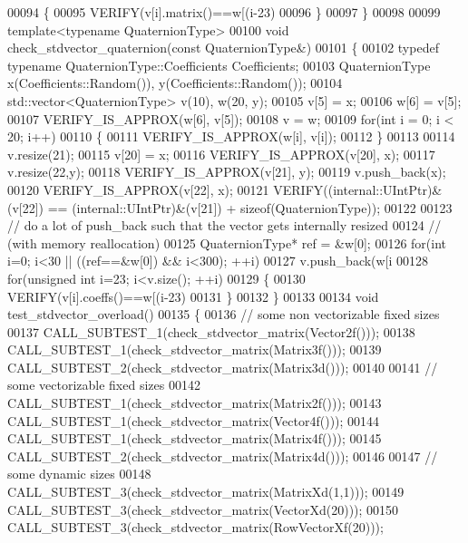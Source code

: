 \begin{DoxyCode}
00094   \{
00095     VERIFY(v[i].matrix()==w[(i-23)%
00096   \}
00097 \}
00098 
00099 \textcolor{keyword}{template}<\textcolor{keyword}{typename} QuaternionType>
00100 \textcolor{keywordtype}{void} check\_stdvector\_quaternion(\textcolor{keyword}{const} QuaternionType&)
00101 \{
00102   \textcolor{keyword}{typedef} \textcolor{keyword}{typename} QuaternionType::Coefficients Coefficients;
00103   QuaternionType x(Coefficients::Random()), y(Coefficients::Random());
00104   std::vector<QuaternionType> v(10), w(20, y);
00105   v[5] = x;
00106   w[6] = v[5];
00107   VERIFY\_IS\_APPROX(w[6], v[5]);
00108   v = w;
00109   \textcolor{keywordflow}{for}(\textcolor{keywordtype}{int} i = 0; i < 20; i++)
00110   \{
00111     VERIFY\_IS\_APPROX(w[i], v[i]);
00112   \}
00113 
00114   v.resize(21);
00115   v[20] = x;
00116   VERIFY\_IS\_APPROX(v[20], x);
00117   v.resize(22,y);
00118   VERIFY\_IS\_APPROX(v[21], y);
00119   v.push\_back(x);
00120   VERIFY\_IS\_APPROX(v[22], x);
00121   VERIFY((internal::UIntPtr)&(v[22]) == (internal::UIntPtr)&(v[21]) + \textcolor{keyword}{sizeof}(QuaternionType));
00122 
00123   \textcolor{comment}{// do a lot of push\_back such that the vector gets internally resized}
00124   \textcolor{comment}{// (with memory reallocation)}
00125   QuaternionType* ref = &w[0];
00126   \textcolor{keywordflow}{for}(\textcolor{keywordtype}{int} i=0; i<30 || ((ref==&w[0]) && i<300); ++i)
00127     v.push\_back(w[i%
00128   \textcolor{keywordflow}{for}(\textcolor{keywordtype}{unsigned} \textcolor{keywordtype}{int} i=23; i<v.size(); ++i)
00129   \{
00130     VERIFY(v[i].coeffs()==w[(i-23)%
00131   \}
00132 \}
00133 
00134 \textcolor{keywordtype}{void} test\_stdvector\_overload()
00135 \{
00136   \textcolor{comment}{// some non vectorizable fixed sizes}
00137   CALL\_SUBTEST\_1(check\_stdvector\_matrix(Vector2f()));
00138   CALL\_SUBTEST\_1(check\_stdvector\_matrix(Matrix3f()));
00139   CALL\_SUBTEST\_2(check\_stdvector\_matrix(Matrix3d()));
00140 
00141   \textcolor{comment}{// some vectorizable fixed sizes}
00142   CALL\_SUBTEST\_1(check\_stdvector\_matrix(Matrix2f()));
00143   CALL\_SUBTEST\_1(check\_stdvector\_matrix(Vector4f()));
00144   CALL\_SUBTEST\_1(check\_stdvector\_matrix(Matrix4f()));
00145   CALL\_SUBTEST\_2(check\_stdvector\_matrix(Matrix4d()));
00146 
00147   \textcolor{comment}{// some dynamic sizes}
00148   CALL\_SUBTEST\_3(check\_stdvector\_matrix(MatrixXd(1,1)));
00149   CALL\_SUBTEST\_3(check\_stdvector\_matrix(VectorXd(20)));
00150   CALL\_SUBTEST\_3(check\_stdvector\_matrix(RowVectorXf(20)));

\end{DoxyCode}
